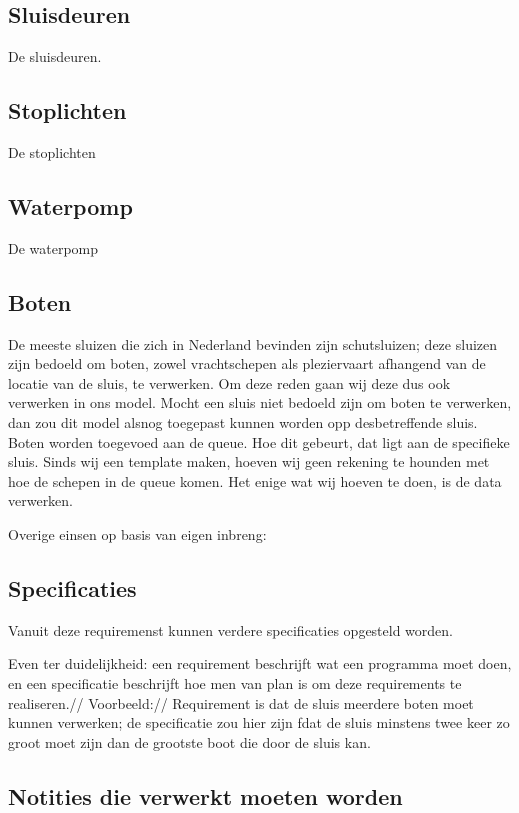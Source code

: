 \documentclass{article}
\begin{document}
	\subsection{Sluisdeuren}
	De sluisdeuren.
	
	\subsection{Stoplichten}
	De stoplichten
	
	\subsection{Waterpomp}
	De waterpomp
	
	\subsection{Boten}
	De meeste sluizen die zich in Nederland bevinden zijn schutsluizen; deze sluizen zijn bedoeld om boten, zowel vrachtschepen als pleziervaart afhangend van de locatie van de sluis, te verwerken. Om deze reden gaan wij deze dus ook verwerken in ons model. Mocht een sluis niet bedoeld zijn om boten te verwerken, dan zou dit model alsnog toegepast kunnen worden opp desbetreffende sluis.
	Boten worden toegevoed aan de queue. Hoe dit gebeurt, dat ligt aan de specifieke sluis.  Sinds wij een template maken, hoeven wij geen rekening te hounden met hoe de schepen in de queue komen. Het enige wat wij hoeven te doen, is de data verwerken.
	
	Overige einsen op basis van eigen inbreng:\\
	
	
	
	\subsection{Specificaties}
	Vanuit deze requiremenst kunnen verdere specificaties opgesteld worden.
	
	Even ter duidelijkheid: een requirement beschrijft wat een programma moet doen, en een specificatie beschrijft hoe men van plan is om deze requirements te realiseren.//
	Voorbeeld:// Requirement is dat de sluis meerdere boten moet kunnen verwerken; de specificatie zou hier zijn fdat de sluis minstens twee keer zo groot moet zijn dan de grootste boot die door de sluis kan.
	
	\subsection{Notities die verwerkt moeten worden}
	
\end{document}
